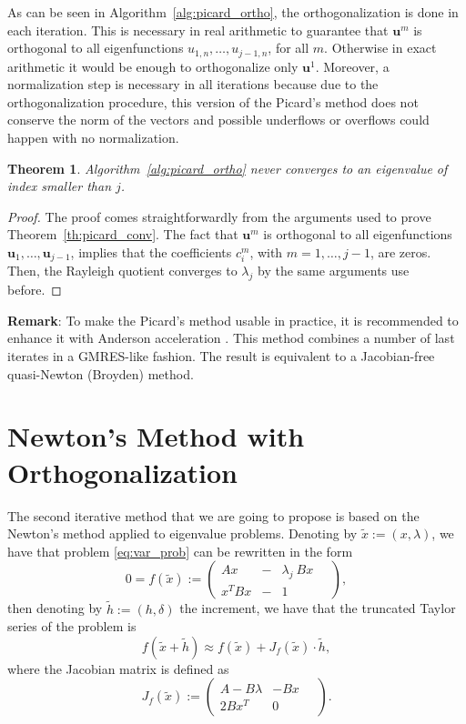\documentclass[preprint,12pt]{elsarticle}
\newtheorem{theorem}{Theorem}[section]
\begin{document}
As can be seen in Algorithm~\ref{alg:picard_ortho}, the orthogonalization is done in each iteration. 
This is necessary in real arithmetic to guarantee that $\mathbf{u}^m$ is orthogonal to all 
eigenfunctions $u_{1,n},\dots,u_{j-1,n}$, for all $m$. Otherwise in exact arithmetic it would 
be enough to orthogonalize only $\mathbf{u}^1$. Moreover, a normalization step is necessary 
in all iterations because due to the orthogonalization procedure, this version of the Picard's 
method does not conserve the norm of the vectors and possible underflows or overflows could 
happen with no normalization.\\

\begin{theorem}
Algorithm~\ref{alg:picard_ortho} never converges to an eigenvalue of index smaller than $j$.
\end{theorem}

\begin{proof}
The proof comes straightforwardly from the arguments used to prove Theorem~\ref{th:picard_conv}.
The fact that $\mathbf{u}^m$ is orthogonal to all eigenfunctions $\mathbf{u}_1,\dots,\mathbf{u}_{j-1}$, implies that the coefficients $c_i^m$, with $m=1,\dots,j-1$, are zeros.
Then, the Rayleigh quotient converges to $\lambda_j$ by the same arguments use before.
\end{proof}



\noindent
{\bf Remark}: To make the Picard's method usable in practice, it is 
recommended to enhance it with Anderson acceleration \cite{anderson}.
This method combines a number of last iterates in a GMRES-like fashion. 
The result is equivalent to a Jacobian-free quasi-Newton (Broyden) method.


\section{Newton's Method with Orthogonalization}\label{sec:newton}

The second iterative method that we are going to propose is based on the Newton's method applied to eigenvalue problems. Denoting by $\tilde x:=(x,\lambda)$, we have that problem \eqref{eq:var_prob} can be rewritten in the form
$$
0=f(\tilde x):=
\left(
\begin{array}{lcl}
A x&-& \lambda_j\ Bx
\\
  x^T Bx&-& 1
\end{array}\quad
\right) ,
$$
then denoting by $\tilde h:=(h, \delta)$ the increment, we have that the truncated Taylor series of the problem is
\begin{equation}\label{eq:newton}
f(\tilde x + \tilde h)\approx f(\tilde x) + J_f(\tilde x)\cdot \tilde h, 
\end{equation}
where the Jacobian matrix is defined as
$$
J_f(\tilde x):=
\left(
\begin{array}{lr}
A - B\lambda & -Bx
\\
  2Bx^T  & 0
\end{array}\quad
\right) .
$$
\end{document}
